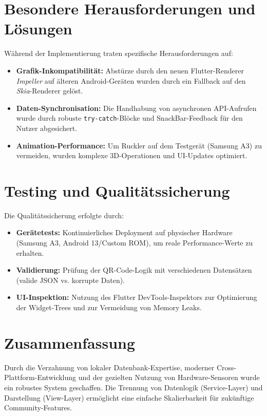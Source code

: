 \section{Besondere Herausforderungen und Lösungen}
Während der Implementierung traten spezifische Herausforderungen auf:

\begin{itemize}
    \item \textbf{Grafik-Inkompatibilität:} Abstürze durch den neuen Flutter-Renderer \textit{Impeller} auf älteren Android-Geräten wurden durch ein Fallback auf den \textit{Skia}-Renderer gelöst.
    \item \textbf{Daten-Synchronisation:} Die Handhabung von asynchronen API-Aufrufen wurde durch robuste \texttt{try-catch}-Blöcke und SnackBar-Feedback für den Nutzer abgesichert.
    \item \textbf{Animation-Performance:} Um Ruckler auf dem Testgerät (Samsung A3) zu vermeiden, wurden komplexe 3D-Operationen und UI-Updates optimiert.
\end{itemize}

\section{Testing und Qualitätssicherung}
Die Qualitätssicherung erfolgte durch:
\begin{itemize}
    \item \textbf{Gerätetests:} Kontinuierliches Deployment auf physischer Hardware (Samsung A3, Android 13/Custom ROM), um reale Performance-Werte zu erhalten.
    \item \textbf{Validierung:} Prüfung der QR-Code-Logik mit verschiedenen Datensätzen (valide JSON vs. korrupte Daten).
    \item \textbf{UI-Inspektion:} Nutzung des Flutter DevTools-Inspektors zur Optimierung der Widget-Trees und zur Vermeidung von Memory Leaks.
\end{itemize}

\section{Zusammenfassung}
Durch die Verzahnung von lokaler Datenbank-Expertise, moderner Cross-Plattform-Entwicklung und der gezielten Nutzung von Hardware-Sensoren wurde ein robustes System geschaffen. Die Trennung von Datenlogik (Service-Layer) und Darstellung (View-Layer) ermöglicht eine einfache Skalierbarkeit für zukünftige Community-Features.